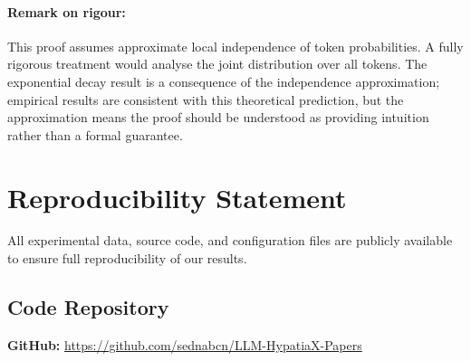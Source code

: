 \documentclass[twoside,11pt]{article}
\begin{document}
\paragraph{Remark on rigour:} This proof assumes approximate local independence of token probabilities. A fully rigorous treatment would analyse the joint distribution over all tokens. The exponential decay result is a consequence of the independence approximation; empirical results are consistent with this theoretical prediction, but the approximation means the proof should be understood as providing intuition rather than a formal guarantee\citep{kambhampati2024llms}.



\section{Reproducibility Statement}
\label{app:reproducibility}

All experimental data, source code, and configuration files are publicly
available to ensure full reproducibility of our results.

\subsection{Code Repository}

\textbf{GitHub:} \url{https://github.com/sednabcn/LLM-HypatiaX-Papers}
\end{document}
